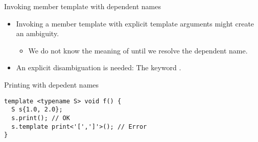 \begin{frame}[t,fragile]{Invoking member template with dependent names}
\begin{itemize}
  \item Invoking a member template with explicit template arguments might create an ambiguity.
    \begin{itemize}
      \item We do not know the meaning of \cppkey{<} until we resolve the dependent name.
    \end{itemize}
  \item An explicit disambiguation is needed: The keyword .
\end{itemize}
\begin{block}{Printing with depedent names}
\begin{lstlisting}
template <typename S> void f() {
  S s{1.0, 2.0};
  s.print(); // OK
  s.template print<'[',']'>(); // Error
}
\end{lstlisting}
\end{block}
\end{frame}
